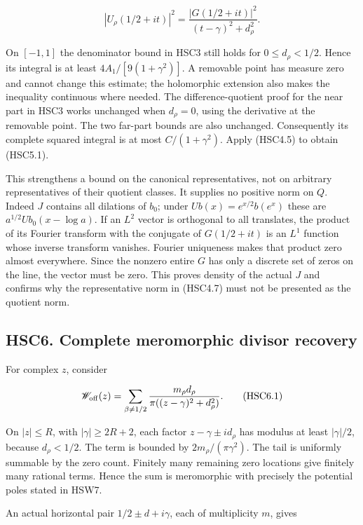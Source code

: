 \[
 |U_\rho(1/2+it)|^2
 =\frac{|G(1/2+it)|^2}{(t-\gamma)^2+d_\rho^2}.
\]

On \([-1,1]\) the denominator bound in HSC3 still holds for
\(0\le d_\rho<1/2\). Hence its integral is at least
\(4A_1/[9(1+\gamma^2)]\). A removable point has measure zero and cannot
change this estimate; the holomorphic extension also makes the
inequality continuous where needed. The difference-quotient proof for
the near part in HSC3 works unchanged when \(d_\rho=0\), using the
derivative at the removable point. The two far-part bounds are also
unchanged. Consequently its complete squared integral is at most
\(C/(1+\gamma^2)\). Apply (HSC4.5) to obtain (HSC5.1).

This strengthens a bound on the canonical representatives, not on
arbitrary representatives of their quotient classes. It supplies no
positive norm on \(Q\). Indeed \(J\) contains all dilations of \(b_0\);
under \(Ub(x)=e^{x/2}b(e^x)\) these are \(a^{1/2}Ub_0(x-\log a)\). If an
\(L^2\) vector is orthogonal to all translates, the product of its
Fourier transform with the conjugate of \(G(1/2+it)\) is an \(L^1\)
function whose inverse transform vanishes. Fourier uniqueness makes that
product zero almost everywhere. Since the nonzero entire \(G\) has only
a discrete set of zeros on the line, the vector must be zero. This
proves density of the actual \(J\) and confirms why the representative
norm in (HSC4.7) must not be presented as the quotient norm.

\subsection{HSC6. Complete meromorphic divisor
recovery}\label{hsc6.-complete-meromorphic-divisor-recovery}

For complex \(z\), consider

\[
 \mathscr W_{\rm off}(z)=
 \sum_{\beta\ne1/2}\frac{m_\rho d_\rho}
 {\pi((z-\gamma)^2+d_\rho^2)}.
\tag{HSC6.1}
\]

On \(|z|\le R\), with \(|\gamma|\ge2R+2\), each factor
\(z-\gamma\pm i d_\rho\) has modulus at least \(|\gamma|/2\), because
\(d_\rho<1/2\). The term is bounded by \(2m_\rho/(\pi\gamma^2)\). The
tail is uniformly summable by the zero count. Finitely many remaining
zero locations give finitely many rational terms. Hence the sum is
meromorphic with precisely the potential poles stated in HSW7.

An actual horizontal pair \(1/2\pm d+i\gamma\), each of multiplicity
\(m\), gives

